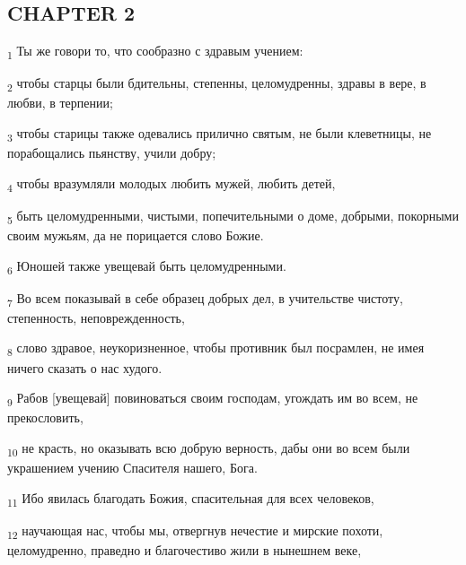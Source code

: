 \subsection{CHAPTER 2}
\begin{tcolorbox}
\textsubscript{1} Ты же говори то, что сообразно с здравым учением:
\end{tcolorbox}
\begin{tcolorbox}
\textsubscript{2} чтобы старцы были бдительны, степенны, целомудренны, здравы в вере, в любви, в терпении;
\end{tcolorbox}
\begin{tcolorbox}
\textsubscript{3} чтобы старицы также одевались прилично святым, не были клеветницы, не порабощались пьянству, учили добру;
\end{tcolorbox}
\begin{tcolorbox}
\textsubscript{4} чтобы вразумляли молодых любить мужей, любить детей,
\end{tcolorbox}
\begin{tcolorbox}
\textsubscript{5} быть целомудренными, чистыми, попечительными о доме, добрыми, покорными своим мужьям, да не порицается слово Божие.
\end{tcolorbox}
\begin{tcolorbox}
\textsubscript{6} Юношей также увещевай быть целомудренными.
\end{tcolorbox}
\begin{tcolorbox}
\textsubscript{7} Во всем показывай в себе образец добрых дел, в учительстве чистоту, степенность, неповрежденность,
\end{tcolorbox}
\begin{tcolorbox}
\textsubscript{8} слово здравое, неукоризненное, чтобы противник был посрамлен, не имея ничего сказать о нас худого.
\end{tcolorbox}
\begin{tcolorbox}
\textsubscript{9} Рабов [увещевай] повиноваться своим господам, угождать им во всем, не прекословить,
\end{tcolorbox}
\begin{tcolorbox}
\textsubscript{10} не красть, но оказывать всю добрую верность, дабы они во всем были украшением учению Спасителя нашего, Бога.
\end{tcolorbox}
\begin{tcolorbox}
\textsubscript{11} Ибо явилась благодать Божия, спасительная для всех человеков,
\end{tcolorbox}
\begin{tcolorbox}
\textsubscript{12} научающая нас, чтобы мы, отвергнув нечестие и мирские похоти, целомудренно, праведно и благочестиво жили в нынешнем веке,
\end{tcolorbox}

